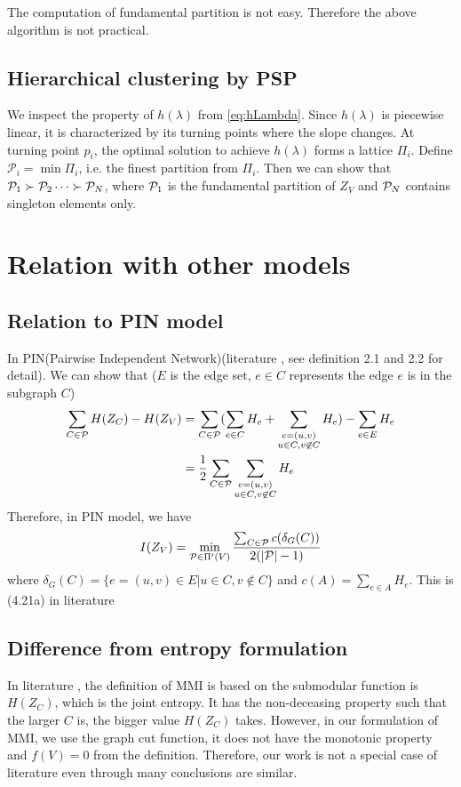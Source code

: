 \documentclass{article}
\begin{document}
The computation of fundamental partition is not easy. Therefore the above algorithm is not practical.

\subsection{Hierarchical clustering by PSP}
We inspect the property of $h(\lambda)$ from \eqref{eq:hLambda}. Since $h(\lambda)$ is piecewise linear, it is characterized by its turning points where the slope changes.
At turning point $p_i$, the optimal solution to achieve $h(\lambda)$ forms a lattice $\Pi_i$.
Define $\mathcal{P}_i = \min \Pi_i$, i.e. the finest partition from $\Pi_i$. Then we can show that
$\P_1 \succ \P_2 \dots \succ \P_N$, where $\P_1$ is the fundamental partition of $Z_V$ and $\P_N$ contains singleton elements only.

\section{Relation with other models}
\subsection{Relation to PIN model}
In PIN(Pairwise Independent Network)(literature \cite{pin}, see definition 2.1 and 2.2 for detail).
We can show that ($E$ is the edge set, $e \in C$ represents the edge $e$ is in the subgraph $C$)
\begin{align*}
\sum_{C \in \P} H(Z_C) - H(Z_V) & = \sum_{C \in \P} (\sum_{e \in C} H_e + \sum_{\substack{e = (u,v) \\ u \in C, v\not\in C }} H_e) - \sum_{e \in E} H_e \\
& = {1 \over 2}\sum_{C \in \P}  \sum_{\substack{e = (u,v) \\ u \in C, v\not\in C }} H_e
\end{align*}
Therefore, in PIN model, we have
\begin{equation}
I(Z_V) = \min_{ \P \in \Pi'(V)} \frac{ \sum_{C \in \P} c(\delta_{G}(C))}{2(\abs{\P} - 1 )}
\end{equation}
where $\delta_{G}(C) = \{e = (u, v) \in E | u \in C, v \not\in C\} $ and $c(A) = \sum_{e\in A} H_e$.
This is (4.21a) in literature \cite{ic}
\subsection{Difference from entropy formulation}
In literature \cite{ic}, the definition of MMI is based on the submodular function is $H(Z_C)$, which is the joint entropy. It has the non-deceasing property such that the larger $C$ is, the bigger value $H(Z_C)$ takes. However, in our formulation of MMI, we use the graph cut function, it does not have the monotonic property and $f(V) = 0$ from the definition. Therefore, our work is not a special case of literature \cite{ic} even through many conclusions are similar.
\end{document}
